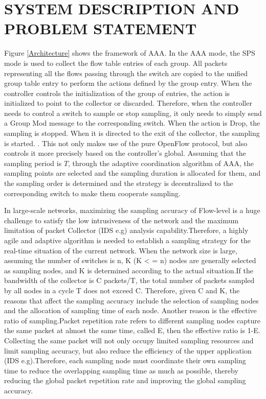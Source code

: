 \documentclass[conference,compsoc]{IEEEtran}
\begin{document}
\section{SYSTEM DESCRIPTION AND PROBLEM STATEMENT }

Figure \ref{Architecture} shows the framework of AAA. In the AAA mode, the SPS mode is used to collect the flow table entries of each group. All packets representing all the flows passing through the switch are copied to the unified group table entry to perform the actions defined by the group entry. When the controller controls the initialization of the group of entries, the action is initialized to point to the collector or discarded. Therefore, when the controller needs to control a switch to sample or stop sampling, it only needs to simply send a Group Mod message to the corresponding switch. When the action is Drop, the sampling is stopped. When it is directed to the exit of the collector, the sampling is started. . This not only makes use of the pure OpenFlow protocol, but also controls it more precisely based on the controller's global. Assuming that the sampling period is $T$, through the adaptive coordination algorithm of AAA, the sampling points are selected and the sampling duration is allocated for them, and the sampling order is determined and the strategy is decentralized to the corresponding switch to make them cooperate sampling.

In large-scale networks, maximizing the sampling accuracy of Flow-level is a huge challenge to satisfy the low intrusiveness of the network and the maximum limitation of packet Collector (IDS e.g) analysis capability.Therefore, a highly agile and adaptive algorithm is needed to establish a sampling strategy for the real-time situation of the current network. When the network size is large, assuming the number of switches is n, K (K < = n) nodes are generally selected as sampling nodes, and K is determined according to the actual situation.If the bandwidth of the collector is C packets/T, the total number of packets sampled by all nodes in a cycle T does not exceed C. Therefore, given C and K, the reasons that affect the sampling accuracy include the selection of sampling nodes and the allocation of sampling time of each node. Another reason is the effective ratio of sampling.Packet repetition rate refers to different sampling nodes capture the same packet at almost the same time, called E, then the effective ratio is 1-E. Collecting the same packet will not only occupy limited sampling resources and limit sampling accuracy, but also reduce the efficiency of the upper application (IDS e.g).Therefore, each sampling node must coordinate their own sampling time to reduce the overlapping sampling time as much as possible, thereby reducing the global packet repetition rate and improving the global sampling accuracy.
\end{document}
